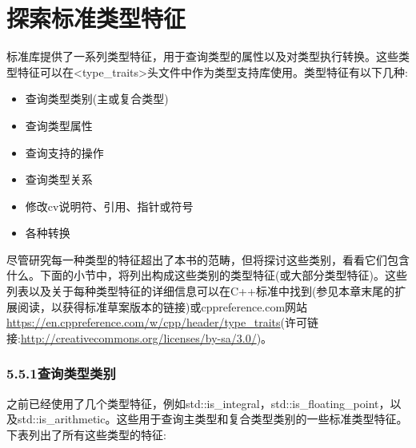 \section{探索标准类型特征}

标准库提供了一系列类型特征，用于查询类型的属性以及对类型执行转换。这些类型特征可以在<type\_traits>头文件中作为类型支持库使用。类型特征有以下几种:

\begin{itemize}
\item
查询类型类别(主或复合类型)

\item
查询类型属性

\item
查询支持的操作

\item
查询类型关系

\item
修改cv说明符、引用、指针或符号

\item
各种转换
\end{itemize}

尽管研究每一种类型的特征超出了本书的范畴，但将探讨这些类别，看看它们包含什么。下面的小节中，将列出构成这些类别的类型特征(或大部分类型特征)。这些列表以及关于每种类型特征的详细信息可以在C++标准中找到(参见本章末尾的扩展阅读，以获得标准草案版本的链接)或cppreference.com网站\url{https://en.cppreference.com/w/cpp/header/type_traits}(许可链接:\url{http://creativecommons.org/licenses/by-sa/3.0/})。

\subsubsection{5.5.1\hspace{0.2cm}查询类型类别}

之前已经使用了几个类型特征，例如std::is\_integral，std::is\_floating\_point，以及std::is\_arithmetic。这些用于查询主类型和复合类型类别的一些标准类型特征。下表列出了所有这些类型的特征:

